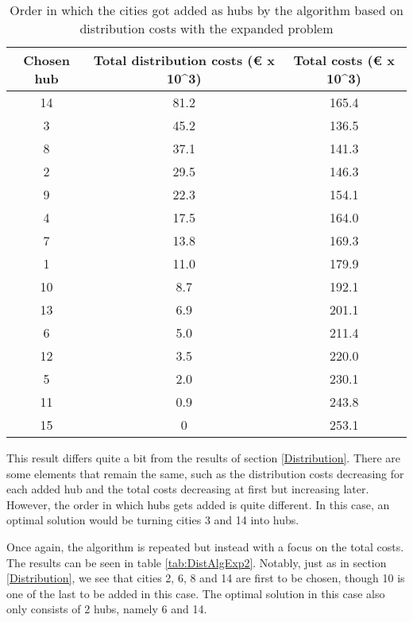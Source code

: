 \documentclass{article}
\begin{document}
\begin{table}[h!]
    \centering
    \begin{tabular}{||c|c|c||}
    \hline
        Chosen hub & Total distribution costs (€ x 10^3) & Total costs (€ x 10^3)  \\
    \hline
    \hline
        14 & 81.2 & 165.4 \\
        \hline
        3 & 45.2 & 136.5 \\
        \hline
        8 & 37.1 & 141.3 \\
        \hline
        2 & 29.5 & 146.3 \\
        \hline
        9 & 22.3 & 154.1 \\
        \hline
        4 & 17.5 & 164.0 \\
        \hline
        7 & 13.8 & 169.3 \\
        \hline
        1 & 11.0 & 179.9 \\
        \hline
        10 & 8.7 & 192.1 \\
        \hline
        13 & 6.9 & 201.1 \\
        \hline
        6 & 5.0 & 211.4 \\
        \hline
        12 & 3.5 & 220.0 \\
        \hline
        5 & 2.0 & 230.1 \\
        \hline
        11 & 0.9 & 243.8 \\
        \hline
        15 & 0 & 253.1 \\
        \hline
    \end{tabular}
    \caption{\centering Order in which the cities got added as hubs by the algorithm based on distribution costs with the expanded problem}
    \label{tab:DistAlgExp}
\end{table}
This result differs quite a bit from the results of section \ref{Distribution}. There are some elements that remain the same, such as the distribution costs decreasing for each added hub and the total costs decreasing at first but increasing later. However, the order in which hubs gets added is quite different. In this case, an optimal solution would be turning cities 3 and 14 into hubs.

Once again, the algorithm is repeated but instead with a focus on the total costs. The results can be seen in table \ref{tab:DistAlgExp2}. Notably, just as in section \ref{Distribution}, we see that cities 2, 6, 8 and 14 are first to be chosen, though 10 is one of the last to be added in this case. The optimal solution in this case also only consists of 2 hubs, namely 6 and 14. 
\end{document}

